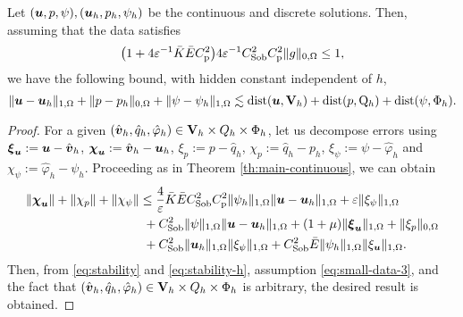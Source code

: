 \begin{theorem}\label{theo:cea}
Let $(\boldsymbol{u},p,\psi), (\boldsymbol{u}_h,p_h,\psi_h)$ be the continuous and discrete solutions. Then, assuming that the data satisfies
\begin{equation}\label{eq:small-data-3}
 \bigl( 1 +4\varepsilon^{-1} \bar{K}\bar{E}C_{\mathrm{p}}^2   \bigr)4\varepsilon^{-1} C_{\mathrm{Sob}}^2 C_{\mathrm{p}}^2\|g\|_{0,\Omega} \leq 1,    
\end{equation}
we have the following bound, with hidden constant independent of $h$, 
\[ \|\boldsymbol{u} - \boldsymbol{u}_h\|_{1,\Omega} + \|p-p_h\|_{0,\Omega} + \|\psi - \psi_h\|_{1,\Omega} 
\lesssim 
\mathrm{dist}(\boldsymbol{u},\mathbf{V}_h)+\mathrm{dist}(p,\mathrm{Q}_h)+\mathrm{dist}(\psi,\Phi_h)
. \]
\end{theorem}
\begin{proof}
 For a given $(\hat{\boldsymbol{v}}_h,\hat{q}_h,\hat{\varphi}_h) \in \mathbf{V}_{h}\times Q_{h}\times\Phi_{h}$, let us  decompose errors 
 using 
 $\mbox{\boldmath{$\xi$}}_{\boldsymbol{u}} := \boldsymbol{u} - \hat{\boldsymbol{v}}_h$,  
 $\mbox{\boldmath{$\chi$}}_{\boldsymbol{u}} := \hat{\boldsymbol{v}}_h - \boldsymbol{u}_h$, 
$\xi_{p} := p - \hat{q}_h$, 
$\chi_{p} := \hat{q}_h - p_h$, $\xi_{\psi} := \psi - \hat{\varphi}_h$ and   
$\chi_{\psi} := \hat{\varphi}_h - \psi_h$. 
%
Proceeding as in Theorem \ref{th:main-continuous}, we can obtain
\begin{align*}
\|\mbox{\boldmath{$\chi$}}_{\boldsymbol{u}}\|+ \|\chi_{p}\| + \|\chi_{\psi}\| & \leq \frac{4}{\varepsilon}\bar{K}\bar{E}C_{\mathrm{Sob}}^2 C_{\mathrm{p}}^2\|\psi_h\|_{1,\Omega} \|\boldsymbol{u} -\boldsymbol{u}_h\|_{1,\Omega} + \varepsilon\|\xi_\psi\|_{1,\Omega} 
\\
& \ + C_{\mathrm{Sob}}^2\|\psi\|_{1,\Omega} \|\boldsymbol{u} -\boldsymbol{u}_h\|_{1,\Omega} + (1+\mu)\|\mbox{\boldmath{$\xi$}}_{\boldsymbol{u}}\|_{1,\Omega} + \|\xi_{p}\|_{0,\Omega} 
\\
& \ + C_{\mathrm{Sob}}^2\|\boldsymbol{u}_h\|_{1,\Omega}\|\xi_{\psi}\|_{1,\Omega} + C_{\mathrm{Sob}}^2\bar{E}\|\psi_h\|_{1,\Omega}\|\xi_{\boldsymbol{u}}\|_{1,\Omega}.
\end{align*}
Then, from 
\eqref{eq:stability} and  \eqref{eq:stability-h}, assumption \eqref{eq:small-data-3}, and the fact that $(\hat{\boldsymbol{v}}_h,\hat{q}_h,\hat{\varphi}_h) \in \mathbf{V}_{h}\times Q_{h}\times\Phi_{h}$ is arbitrary, the desired result is obtained.
\end{proof}
